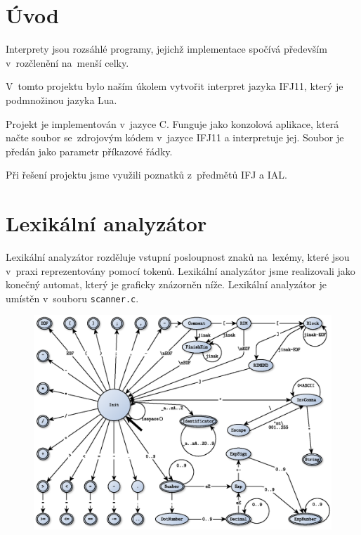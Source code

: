 \documentclass[12pt,a4paper,titlepage,final]{article}
\begin{document}

\def\projname{Implementace interpretu imperativního jazyka IFJ11}


\pagestyle{plain}
\setcounter{page}{1}
\tableofcontents

\newpage
\pagestyle{plain}
\setcounter{page}{1}

\section{Úvod}
Interprety jsou rozsáhlé programy, jejichž implementace spočívá především
v~rozčlenění na~men\-ší celky.

V~tomto projektu bylo naším úkolem vytvořit interpret jazyka IFJ11, který je
podmnožinou jazyka Lua.

Projekt je implementován v~jazyce C. Funguje jako konzolová aplikace, která
načte soubor se~zdrojovým kódem v~jazyce IFJ11 a interpretuje jej. Soubor je
předán jako parametr příkazové řádky.

Při řešení projektu jsme využili poznatků z~předmětů IFJ a IAL.

\section{Lexikální analyzátor}
Lexikální analyzátor rozděluje vstupní posloupnost znaků na~lexémy, které
jsou v~praxi repre\-zen\-to\-vány pomocí tokenů. Lexikální analyzátor jsme realizovali
jako konečný automat, který je graficky znázorněn níže. Lexikální
analyzátor je umístěn v~souboru \texttt{scanner.c}.
\begin{figure}[!h]
  \centering
  \includegraphics[width=1\textwidth]{img/autom.eps}
\end{figure}
\end{document}
